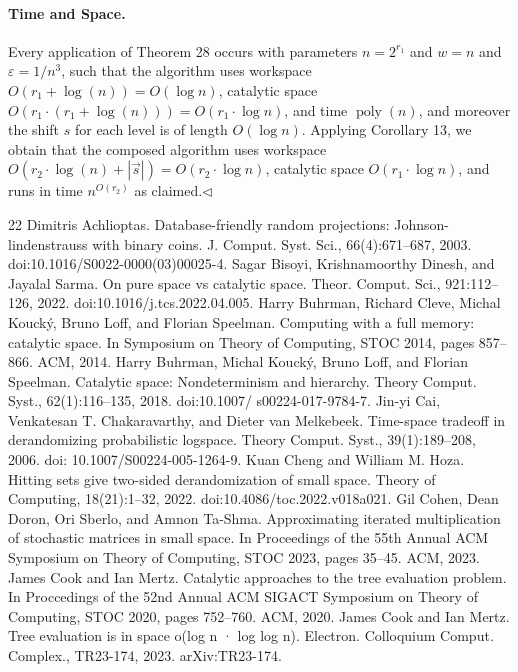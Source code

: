 \documentclass[10pt,a4paper]{article}
\begin{document}
\paragraph{Time and Space.} Every application of Theorem 28 occurs with parameters $n=2^{r_1}$ and $w=n$ and $\varepsilon=1/n^3$, such that the algorithm uses workspace $O(r_1+\log(n))=O(\log n)$, catalytic space $O(r_1\cdot(r_1+\log(n)))=O(r_1\cdot\log n)$, and time $\operatorname{poly}(n)$, and moreover the shift $s$ for each level is of length $O(\log n)$. Applying Corollary 13, we obtain that the composed algorithm uses workspace $O(r_2\cdot\log(n)+|\vec s|)=O(r_2\cdot\log n)$, catalytic space $O(r_1\cdot\log n)$, and runs in time $n^{O(r_2)}$ as claimed.\hfill$\triangleleft$

\begin{thebibliography}{22}
 Dimitris Achlioptas. Database-friendly random projections: Johnson-lindenstrauss with binary coins. J. Comput. Syst. Sci., 66(4):671–687, 2003. doi:10.1016/S0022-0000(03)00025-4.
 Sagar Bisoyi, Krishnamoorthy Dinesh, and Jayalal Sarma. On pure space vs catalytic space. Theor. Comput. Sci., 921:112–126, 2022. doi:10.1016/j.tcs.2022.04.005.
 Harry Buhrman, Richard Cleve, Michal Koucký, Bruno Loff, and Florian Speelman. Computing with a full memory: catalytic space. In Symposium on Theory of Computing, STOC 2014, pages 857–866. ACM, 2014.
 Harry Buhrman, Michal Koucký, Bruno Loff, and Florian Speelman. Catalytic space: Nondeterminism and hierarchy. Theory Comput. Syst., 62(1):116–135, 2018. doi:10.1007/ s00224-017-9784-7.
 Jin-yi Cai, Venkatesan T. Chakaravarthy, and Dieter van Melkebeek. Time-space tradeoff in derandomizing probabilistic logspace. Theory Comput. Syst., 39(1):189–208, 2006. doi: 10.1007/S00224-005-1264-9.
 Kuan Cheng and William M. Hoza. Hitting sets give two-sided derandomization of small space. Theory of Computing, 18(21):1–32, 2022. doi:10.4086/toc.2022.v018a021.
 Gil Cohen, Dean Doron, Ori Sberlo, and Amnon Ta-Shma. Approximating iterated multiplication of stochastic matrices in small space. In Proceedings of the 55th Annual ACM Symposium on Theory of Computing, STOC 2023, pages 35–45. ACM, 2023.
 James Cook and Ian Mertz. Catalytic approaches to the tree evaluation problem. In Proccedings of the 52nd Annual ACM SIGACT Symposium on Theory of Computing, STOC 2020, pages 752–760. ACM, 2020.
 James Cook and Ian Mertz. Tree evaluation is in space o(log n · log log n). Electron. Colloquium Comput. Complex., TR23-174, 2023. arXiv:TR23-174.

\end{thebibliography}
\end{document}
